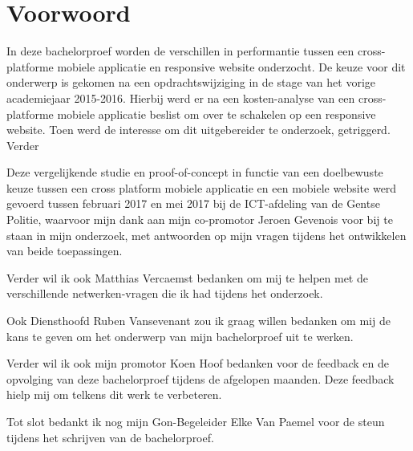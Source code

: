 
\chapter*{Voorwoord}
\label{ch:voorwoord}


In deze bachelorproef worden de verschillen in performantie tussen een cross-platforme mobiele applicatie en responsive website onderzocht.
De keuze voor dit onderwerp is gekomen na een opdrachtswijziging in de stage van het vorige academiejaar 2015-2016. Hierbij werd er na
een kosten-analyse van een cross-platforme mobiele applicatie beslist om over te schakelen op een responsive website. Toen werd de
interesse om dit uitgebereider te onderzoek, getriggerd. Verder

Deze vergelijkende studie en proof-of-concept in functie van een doelbewuste keuze tussen een cross platform mobiele applicatie en
een mobiele website werd gevoerd tussen februari 2017 en mei 2017 bij de ICT-afdeling van de Gentse Politie, waarvoor mijn dank aan mijn
co-promotor Jeroen Gevenois voor bij te staan in mijn onderzoek, met antwoorden op mijn vragen tijdens het ontwikkelen van beide toepassingen.

Verder wil ik ook Matthias Vercaemst bedanken om mij te helpen met de verschillende netwerken-vragen die ik had tijdens het onderzoek.

Ook Diensthoofd Ruben Vansevenant zou ik graag willen bedanken om mij de kans te geven om het onderwerp van mijn bachelorproef uit te werken.

Verder wil ik ook mijn promotor Koen Hoof bedanken voor de feedback en de opvolging van deze bachelorproef tijdens de afgelopen maanden.
Deze feedback hielp mij om telkens dit werk te verbeteren.

Tot slot bedankt ik nog mijn Gon-Begeleider Elke Van Paemel voor de steun tijdens het schrijven van de bachelorproef.
